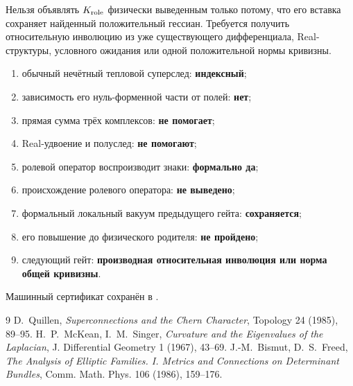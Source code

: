 \begin{nogocriterion}
Нельзя объявлять $K_{\rm role}$ физически выведенным только потому, что его
вставка сохраняет найденный положительный гессиан. Требуется получить
относительную инволюцию из уже существующего дифференциала, Real-структуры,
условного ожидания или одной положительной нормы кривизны.
\end{nogocriterion}

\begin{protocol}
\begin{enumerate}
 \item обычный нечётный тепловой суперслед: \textbf{индексный};
 \item зависимость его нуль-форменной части от полей: \textbf{нет};
 \item прямая сумма трёх комплексов: \textbf{не помогает};
 \item Real-удвоение и полуслед: \textbf{не помогают};
 \item ролевой оператор воспроизводит знаки: \textbf{формально да};
 \item происхождение ролевого оператора: \textbf{не выведено};
 \item формальный локальный вакуум предыдущего гейта: \textbf{сохраняется};
 \item его повышение до физического родителя: \textbf{не пройдено};
 \item следующий гейт: \textbf{производная относительная инволюция или
 норма общей кривизны}.
\end{enumerate}
\end{protocol}

Машинный сертификат сохранён в
.

\begin{thebibliography}{9}
D.~Quillen,
\emph{Superconnections and the Chern Character},
Topology 24 (1985), 89--95.
H.~P.~McKean, I.~M.~Singer,
\emph{Curvature and the Eigenvalues of the Laplacian},
J. Differential Geometry 1 (1967), 43--69.
J.-M.~Bismut, D.~S.~Freed,
\emph{The Analysis of Elliptic Families. I. Metrics and Connections on
Determinant Bundles},
Comm. Math. Phys. 106 (1986), 159--176.
\end{thebibliography}